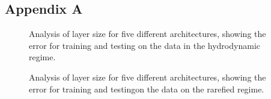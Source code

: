 \documentclass[12pt, a4paper]{article}
\begin{document}
\subsection{Appendix A}\label{AppendixA}
\begin{center}
	\begin{figure}[htbp!]
		\scalebox{.9}{}
		\scalebox{.9}{}
		\scalebox{.9}{}
		\scalebox{.9}{}
		\scalebox{.9}{}
		\caption{Analysis of layer size for five different architectures, showing the error for training and testing on the data in the hydrodynamic regime.}
		\label{Fig:Layer Size Hydro}
	\end{figure}
\end{center}
\begin{center}
	\begin{figure}[htbp!]
		\scalebox{.9}{}
		\scalebox{.9}{}
		\scalebox{.9}{}
		\scalebox{.9}{}
		\scalebox{.9}{}
		\caption{Analysis of layer size for five different architectures, showing the error for training and testingon the data on the rarefied regime.}
		\label{Fig:Layer Size Rare}
	\end{figure}
\end{center}
\end{document}
